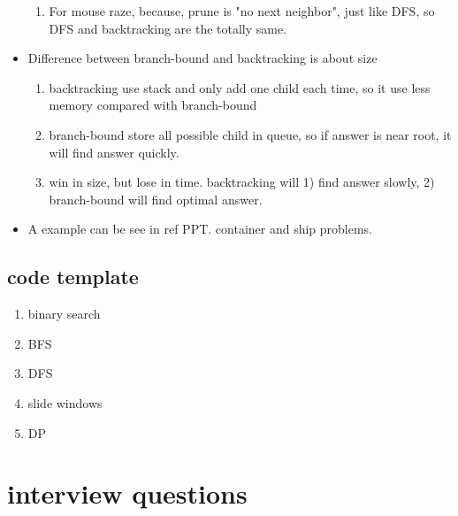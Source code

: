 \documentclass[a4paper,11pt,twoside]{book}
\begin{document}
\begin{itemize}
\begin{enumerate}
\item For mouse raze, because, prune is "no next neighbor", just like DFS, so DFS and backtracking are the totally same.
\end{enumerate}

\item Difference between branch-bound  and backtracking is about size
\begin{enumerate}
\item backtracking use stack and only add one child each time, so it use less memory compared with branch-bound
\item branch-bound store all possible child in queue, so if answer is near root, it will find answer quickly. 

\item win in size, but lose in time. backtracking will 1) find answer slowly, 2) branch-bound will find optimal answer. 
\end{enumerate}

\item A example can be see in ref PPT.  container and ship problems. 

\end{itemize}

\section{code template}
\begin{enumerate}
	\item binary search
	\item BFS
	\item DFS
	\item slide windows
	\item DP
\end{enumerate}

\chapter{interview questions}
\end{document}
